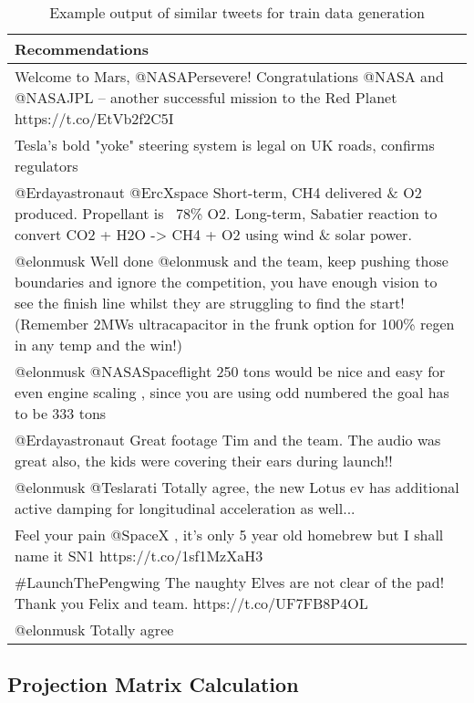 \begin{table}[!h]
	\centering
	\caption{Example output of similar tweets for train data generation}
	\label{tab:example-train-data}
	\begin{tabular}{|m{}|}
		\hline
		\textbf{Recommendations} \\
		\hline
		Welcome to Mars, @NASAPersevere! Congratulations @NASA and @NASAJPL – another successful mission to the Red Planet https://t.co/EtVb2f2C5I \\
		\hline
		Tesla’s bold "yoke" steering system is legal on UK roads, confirms regulators \\
		\hline
		@Erdayastronaut @ErcXspace Short-term, CH4 delivered \& O2 produced. Propellant is ~78\% O2. Long-term, Sabatier reaction to convert CO2 + H2O -> CH4 + O2 using wind \& solar power. \\
		\hline
		@elonmusk Well done @elonmusk and the team, keep pushing those boundaries and ignore the competition,  you have enough vision to see the finish line whilst they are struggling to find the start! (Remember 2MWs ultracapacitor in the frunk option for 100\% regen in any temp and the win!) \\
		\hline
		@elonmusk @NASASpaceflight 250 tons would be nice and easy for even engine scaling , since you are using odd numbered the goal has to be 333 tons \\
		\hline
		@Erdayastronaut Great footage Tim and the team. The audio was great also,  the kids were covering their ears during launch!! \\
		\hline
		@elonmusk @Teslarati Totally agree, the new Lotus ev has additional active damping for longitudinal acceleration as well... \\
		\hline
		Feel your pain @SpaceX , it's only 5 year old homebrew but I shall name it SN1 https://t.co/1sf1MzXaH3 \\
		\hline
		\#LaunchThePengwing The naughty Elves are not clear of the pad! Thank you Felix and team. https://t.co/UF7FB8P4OL \\
		\hline
		@elonmusk Totally agree \\
		\hline
	\end{tabular}
\end{table}


\subsection{Projection Matrix Calculation}
\label{subsec:projection-matrix-calculation}


